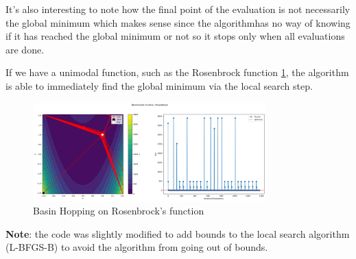 It's also interesting to note how the final point of the evaluation is not necessarily the global minimum which makes sense since the algorithmhas no way of knowing if it has reached the global minimum or not so it stops only when all evaluations are done.

If we have a unimodal function, such as the Rosenbrock function \ref*{fig:bh-rosenbrock}, the algorithm is able to immediately find the global minimum via the local search step.
\begin{figure}[H]
    \centering
    \includegraphics[width=0.8\textwidth]{lab2/imgs/bh_rosenbrock.png}
    \caption{Basin Hopping on Rosenbrock's function}
    \label{fig:bh-rosenbrock}
\end{figure}

\noindent
\textbf{Note}: the code was slightly modified to add bounds to the local search algorithm (L-BFGS-B) to avoid the algorithm from going out of bounds.

